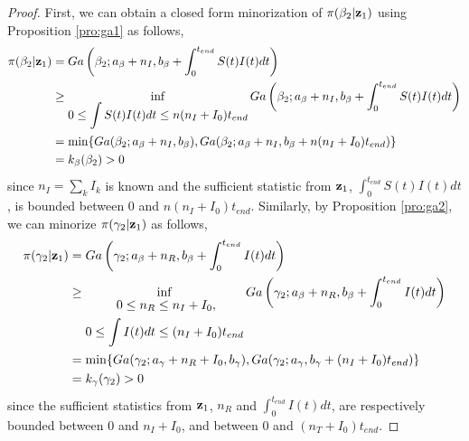 \documentclass[11pt]{article}
\begin{document}
\begin{proof}
		First, we can obtain a closed form minorization of $\pi(\beta_2| \mathbf{z}_1)$ using Proposition \ref{pro:ga1} as follows,
		\begin{align*}
			\pi(\beta_2| \mathbf{z}_1) 
			& = Ga\left(\beta_2; a_{\beta} + n_I, b_{\beta} + \int_{0}^{t_{end}}S(t)I(t)dt\right) \\
			& \ge \inf_{\begin{aligned}
				 0\le \int S(t)I(t)dt \le n(n_I+I_0) t_{end}
		\end{aligned}}   Ga\left(\beta_2; a_{\beta} + n_I, b_{\beta} + \int_{0}^{t_{end}}S(t)I(t)dt\right) \\
			& = \min\{Ga(\beta_2;a_{\beta}+n_I, b_{\beta}), Ga(\beta_2;a_{\beta}+n_I,b_{\beta}+n(n_I+I_0) t_{end})\} \\
			& = k_\beta(\beta_2) > 0
		\end{align*}
		since $n_I = \sum_k I_k$ is known and the sufficient statistic from $\mathbf{z}_1$, 
		$\int_{0}^{t_{end}}S(t)I(t)dt$, is bounded between $0$ and $n (n_I+I_0)t_{end}$. Similarly, by Proposition \ref{pro:ga2}, we can minorize $\pi(\gamma_2| \mathbf{z}_1)$ as follows,
		\begin{align*}
			\pi(\gamma_2| \mathbf{z}_1) 
			& = Ga\left(\gamma_2; a_{\beta} + n_R, b_{\beta} + \int_{0}^{t_{end}}I(t)dt\right)  \\
			& \ge \inf_{\begin{aligned}
				 0 \le n_R &\le n_I + I_0, \\
				 0 \le \int I(t)dt &\le (n_I+I_0) t_{end}
		\end{aligned}} Ga\left(\gamma_2; a_{\beta} + n_R, b_{\beta} + \int_{0}^{t_{end}}I(t)dt\right) \\
			& = \min\{		Ga(\gamma_2;a_{\gamma}+n_R+I_0,b_{\gamma}), Ga(\gamma_2;a_{\gamma},b_{\gamma}+(n_I+I_0) t_{end})\} \\
			& = k_\gamma(\gamma_2) > 0
		\end{align*}
		since the sufficient statistics from $\mathbf{z}_1$, $n_R$ and $\int_{0}^{t_{end}}I(t)dt$, are respectively bounded between $0$ and $n_I + I_0$, and between $0$ and $(n_T+I_0) t_{end}$.
		

\end{proof}
\end{document}
